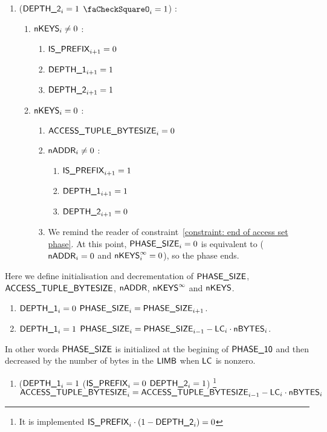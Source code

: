 \begin{enumerate}[resume]
	\item \If ($\textsf{DEPTH\_2}_{i}=1$ \et $\done_{i}=1$) \Then:
		\begin{enumerate}
			\item \If $\textsf{nKEYS}_{i} \ne 0$ \Then:
				\begin{enumerate}
					\item $\textsf{IS\_PREFIX}_{i+1}=0$  
					\item $\textsf{DEPTH\_1}_{i+1}=1$ 
					\item $\textsf{DEPTH\_2}_{i+1}=1$
				\end{enumerate}
			\item \If $\textsf{nKEYS}_{i}=0$ \Then:
				\begin{enumerate}
					\item $\textsf{ACCESS\_TUPLE\_BYTESIZE}_{i}=0$
					\item \If $\textsf{nADDR}_{i} \ne 0$ \Then:
						\begin{enumerate}
							\item $\textsf{IS\_PREFIX}_{i+1}=1$
							\item $\textsf{DEPTH\_1}_{i+1}=1$
							\item $\textsf{DEPTH\_2}_{i+1}=0$
						\end{enumerate}
					\item \trash We remind the reader of constraint~\ref{constraint: end of access set phase}. At this point, $\textsf{PHASE\_SIZE}_{i}=0$ is equivalent to ($\textsf{nADDR}_{i} = 0$ and $\textsf{nKEYS}^\infty_{i}=0$), so the phase ends.
				\end{enumerate} 
		\end{enumerate}
\end{enumerate}
Here we define initialisation and decrementation of $\textsf{PHASE\_SIZE}$, $\textsf{ACCESS\_TUPLE\_BYTESIZE}$, $\textsf{nADDR}$, $\textsf{nKEYS}^\infty$ and $\textsf{nKEYS}$.
\begin{enumerate}[resume]
	\item \If $\textsf{DEPTH\_1}_{i}=0$ \Then $\textsf{PHASE\_SIZE}_{i} = \textsf{PHASE\_SIZE}_{i+1}$.
	\item \If $\textsf{DEPTH\_1}_{i}=1$ \Then $\textsf{PHASE\_SIZE}_{i} = \textsf{PHASE\_SIZE}_{i-1} - \textsf{LC}_{i} \cdot \textsf{nBYTES}_{i}$. 
\end{enumerate}
In other words $\textsf{PHASE\_SIZE}$ is initialized at the begining of $\textsf{PHASE\_10}$ and then decreased by the number of bytes in the $\textsf{LIMB}$ when $\textsf{LC}$ is nonzero.
\begin{enumerate}[resume]

	\item \If ($\textsf{DEPTH\_1}_{i}=1$ \et ($\textsf{IS\_PREFIX}_{i}=0$ \Or $\textsf{DEPTH\_2}_{i}=1$) \footnote{It is implemented \If $\textsf{IS\_PREFIX}_{i} \cdot (1 - \textsf{DEPTH\_2}_{i})=0$ \Then} \Then $\textsf{ACCESS\_TUPLE\_BYTESIZE}_{i}=\textsf{ACCESS\_TUPLE\_BYTESIZE}_{i-1} - \textsf{LC}_{i} \cdot \textsf{nBYTES}_{i}$

\end{enumerate}

